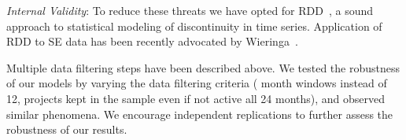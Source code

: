 \smallskip \emph{Internal Validity}: %
To reduce these threats we have opted for RDD~\cite{imbens2008regression}, 
a sound approach to statistical modeling of discontinuity in time series. 
Application of RDD to SE data has been recently advocated 
by Wieringa~\cite{Wieringa}.
 
 
 
Multiple data filtering 
steps have been described above.
We tested the robustness of our models by varying the data filtering 
criteria ( month windows instead of 12, projects kept in the sample even 
if not active all 24 months), and observed similar phenomena.
%
We encourage independent replications to further assess the robustness of our results.
 


